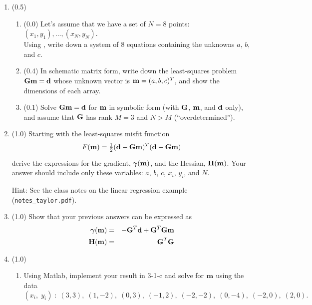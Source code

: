 \documentclass[11pt,titlepage,fleqn]{article}
\begin{document}
\begin{enumerate}
\item (0.5) 

\begin{enumerate}
\item (0.0) Let's assume that we have a set of $N=8$ points: $(x_1,y_1), \ldots, (x_N,y_N)$. \\
Using , write down a system of 8 equations containing the unknowns $a$, $b$, and $c$.

\item  (0.4) In schematic matrix form, write down the least-squares problem $\mbox{${\bf G}$}\mbox{${\bf m}$}=\mbox{${\bf d}$}$ whose unknown vector is $\mbox{${\bf m}$} = (a,b,c)^T$, and show the dimensions of each array.

\item (0.1) Solve $\mbox{${\bf G}$}\mbox{${\bf m}$}=\mbox{${\bf d}$}$ for $\mbox{${\bf m}$}$ in symbolic form (\ie with $\mbox{${\bf G}$}$, $\mbox{${\bf m}$}$, and $\mbox{${\bf d}$}$ only), and assume that $\mbox{${\bf G}$}$ has rank $M = 3$ and $N > M$ (``overdetermined'').
\end{enumerate}


\item (1.0) Starting with the least-squares misfit function
%
\begin{equation}
F(\bem) = \hlf (\bd - \bG\bem)^T(\bd - \bG\bem)
\end{equation}
%
derive the expressions for the gradient, $\mbox{\boldmath $\bf \gamma$}(\mbox{${\bf m}$})$, and the Hessian, $\mbox{${\bf H}$}(\mbox{${\bf m}$})$. Your answer should include only these variables: $a$, $b$, $c$, $x_i$, $y_i$, and $N$.

Hint: See the class notes on the linear regression example (\verb+notes_taylor.pdf+).


\item (1.0) Show that your previous answers can be expressed as
%
\begin{eqnarray}
\mbox{\boldmath $\bf \gamma$}(\mbox{${\bf m}$}) &=& -\mbox{${\bf G}$}^T\mbox{${\bf d}$} + \mbox{${\bf G}$}^T\mbox{${\bf G}$}\mbox{${\bf m}$}
\\
\mbox{${\bf H}$}(\mbox{${\bf m}$}) &=& \mbox{${\bf G}$}^T\mbox{${\bf G}$}
\end{eqnarray}


\item (1.0)
\begin{enumerate}
\item Using Matlab, implement your result in 3-1-c and solve for $\mbox{${\bf m}$}$ using the data
%
\begin{equation*}
(x_i,\;y_i) \;:\; (3,3),\;(1,-2),\;(0,3),\;(-1,2),\;(-2,-2),\;(0,-4),\;(-2,0),\;(2,0).
\end{equation*}


\end{enumerate}
\end{enumerate}
\end{document}
